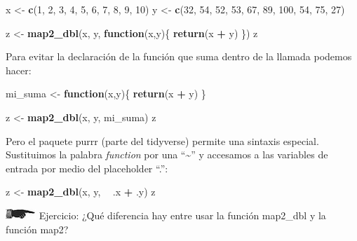 \documentclass[]{book}
\newenvironment{Shaded}{\begin{snugshade}}{\end{snugshade}}
\newcommand{\KeywordTok}[1]{\textcolor[rgb]{0.13,0.29,0.53}{\textbf{#1}}}
\newcommand{\DecValTok}[1]{\textcolor[rgb]{0.00,0.00,0.81}{#1}}
\newcommand{\StringTok}[1]{\textcolor[rgb]{0.31,0.60,0.02}{#1}}
\newcommand{\ControlFlowTok}[1]{\textcolor[rgb]{0.13,0.29,0.53}{\textbf{#1}}}
\newcommand{\OperatorTok}[1]{\textcolor[rgb]{0.81,0.36,0.00}{\textbf{#1}}}
\newcommand{\NormalTok}[1]{#1}
\theoremstyle{definition}
\theoremstyle{definition}
\theoremstyle{definition}
\theoremstyle{remark}
\begin{document}
\begin{Shaded}
\begin{Highlighting}[]
\NormalTok{x <-}\StringTok{ }\KeywordTok{c}\NormalTok{(}\DecValTok{1}\NormalTok{, }\DecValTok{2}\NormalTok{, }\DecValTok{3}\NormalTok{, }\DecValTok{4}\NormalTok{, }\DecValTok{5}\NormalTok{, }\DecValTok{6}\NormalTok{, }\DecValTok{7}\NormalTok{, }\DecValTok{8}\NormalTok{, }\DecValTok{9}\NormalTok{, }\DecValTok{10}\NormalTok{)}
\NormalTok{y <-}\StringTok{ }\KeywordTok{c}\NormalTok{(}\DecValTok{32}\NormalTok{, }\DecValTok{54}\NormalTok{, }\DecValTok{52}\NormalTok{, }\DecValTok{53}\NormalTok{, }\DecValTok{67}\NormalTok{, }\DecValTok{89}\NormalTok{, }\DecValTok{100}\NormalTok{, }\DecValTok{54}\NormalTok{, }\DecValTok{75}\NormalTok{, }\DecValTok{27}\NormalTok{)}


\NormalTok{z <-}\StringTok{ }\KeywordTok{map2_dbl}\NormalTok{(x, y, }\ControlFlowTok{function}\NormalTok{(x,y)\{ }\KeywordTok{return}\NormalTok{(x }\OperatorTok{+}\StringTok{ }\NormalTok{y) \})}
\NormalTok{z}
\end{Highlighting}
\end{Shaded}

Para evitar la declaración de la función que suma dentro de la llamada
podemos hacer:

\begin{Shaded}
\begin{Highlighting}[]
\NormalTok{mi_suma <-}\StringTok{ }\ControlFlowTok{function}\NormalTok{(x,y)\{ }
  \KeywordTok{return}\NormalTok{(x }\OperatorTok{+}\StringTok{ }\NormalTok{y) }
\NormalTok{\}}

\NormalTok{z <-}\StringTok{ }\KeywordTok{map2_dbl}\NormalTok{(x, y, mi_suma)}
\NormalTok{z}
\end{Highlighting}
\end{Shaded}

Pero el paquete purrr (parte del tidyverse) permite una sintaxis
especial. Sustituimos la palabra \emph{function} por una
``\textasciitilde{}'' y accesamos a las variables de entrada por medio
del placeholder ``.'':

\begin{Shaded}
\begin{Highlighting}[]
\NormalTok{z <-}\StringTok{ }\KeywordTok{map2_dbl}\NormalTok{(x, y, }\OperatorTok{~}\StringTok{ }\NormalTok{.x }\OperatorTok{+}\StringTok{ }\NormalTok{.y)}
\NormalTok{z}
\end{Highlighting}
\end{Shaded}

\includegraphics{./imagenes/manicule2.jpg} Ejercicio: ¿Qué diferencia
hay entre usar la función map2\_dbl y la función map2?
\end{document}
